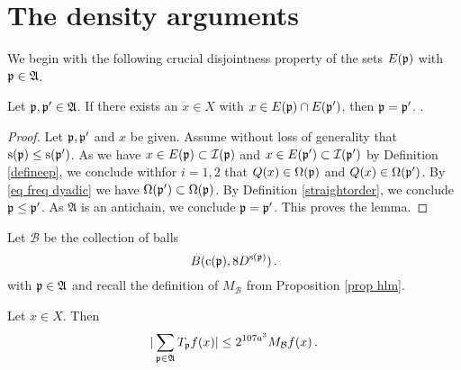 \section{The density  arguments}\label{sec TT* T*T}

We begin with the following crucial disjointness property of the sets $E(\mathfrak p)$ with $\mathfrak p \in \mathfrak{A}$.
\begin{lemma}
\label{lem antichain -1}
Let $\mathfrak p,\mathfrak p'\in \mathfrak{A}$.
If there exists an $x\in X$ with $x\in  E(\mathfrak p)\cap E(\mathfrak p')$,
then $\mathfrak p= \mathfrak p'$.
.
\end{lemma}
\begin{proof}
Let $\mathfrak p,\mathfrak p'$ and $x$ be given.
Assume without loss of generality that $\mathrm{s}(\mathfrak p)\le \mathrm{s}(\mathfrak p')$.
As  we have $x\in E(\mathfrak p)\subset \mathcal{I}(\mathfrak p)$  and $x\in E(\mathfrak p')\subset \mathcal{I}(\mathfrak p')$ by Definition \eqref{defineep}, we conclude
withfor $i=1,2$ that
${Q}(x)\in\Omega(\mathfrak p)$ and ${Q}(x)\in\Omega(\mathfrak p')$. By \eqref{eq freq dyadic} we have $\Omega(\mathfrak p')\subset \Omega(\mathfrak p)$. By Definition
\eqref{straightorder}, we conclude $\mathfrak p\le \mathfrak p'$. As $\mathfrak{A}$ is an antichain, we conclude $\mathfrak p=\mathfrak p'$.
This proves the lemma.
\end{proof}



Let $\mathcal{B}$ be the collection of balls
\begin{equation}
    B(\mathrm{c}(\mathfrak p), 8D^{\mathrm{s}(\mathfrak p)})\, .
\end{equation}
with $\mathfrak p\in \mathfrak{A}$ and recall the definition of
$M_{\mathcal{B}}$ from Proposition \ref{prop hlm}.
\begin{lemma}\label{lem hlmbound}
Let $x\in X$.
Then
\begin{equation}\label{hlmbound}
    | \sum_{\mathfrak p \in \mathfrak{A}}T_{\mathfrak p} f(x)|\le 2^{107 a^3} M_{\mathcal{B}} f (x) \, .
\end{equation}
\end{lemma}



